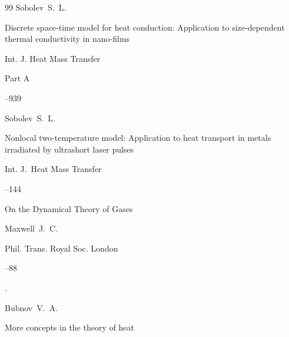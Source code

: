 \begin{thebibliography}{99}
\by Sobolev~S.~L.

\paper Discrete space-time model for heat conduction: Application to size-dependent thermal conductivity in nano-films

\jour Int. J. Heat Mass Transfer



\issueinfo Part A

--939




\by Sobolev~S.~L.

\paper Nonlocal two-temperature model: Application to heat transport in metals irradiated by ultrashort laser pulses

\jour Int. J.~Heat Mass Transfer



–144







\paper On the Dynamical Theory of Gases

\by  Maxwell~J.~C. 

\jour Phil. Trans. Royal Soc. London



–88

\moreref 

 \nofrills

\moreref 

 \nofrills

\moreref 

 \nofrills

\moreref 

. \nofrills










\by Bubnov~V.~A.

\paper More concepts in the theory of heat


\end{thebibliography}
